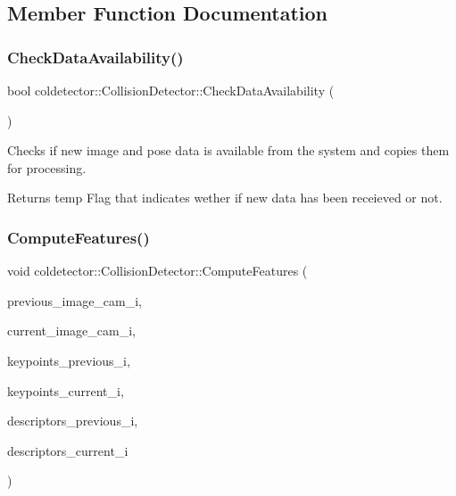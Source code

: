 \subsection{Member Function Documentation}
\mbox{\label{classcoldetector_1_1CollisionDetector_aa4b6c5b052532e545758f84a668b43b2}} 
\subsubsection{\texorpdfstring{Check\+Data\+Availability()}{CheckDataAvailability()}}
{\footnotesize\ttfamily bool coldetector\+::\+Collision\+Detector\+::\+Check\+Data\+Availability (\begin{DoxyParamCaption}{ }\end{DoxyParamCaption})}



Checks if new image and pose data is available from the system and copies them for processing. 

\begin{DoxyReturn}{Returns}
temp Flag that indicates wether if new data has been receieved or not. 
\end{DoxyReturn}
\mbox{\label{classcoldetector_1_1CollisionDetector_af385733b461bda4f537cb97f7616a352}} 
\subsubsection{\texorpdfstring{Compute\+Features()}{ComputeFeatures()}}
{\footnotesize\ttfamily void coldetector\+::\+Collision\+Detector\+::\+Compute\+Features (\begin{DoxyParamCaption}\item[{const cv\+::\+Mat \&}]{previous\+\_\+image\+\_\+cam\+\_\+i,  }\item[{const cv\+::\+Mat \&}]{current\+\_\+image\+\_\+cam\+\_\+i,  }\item[{std\+::vector$<$ cv\+::\+Key\+Point $>$ \&}]{keypoints\+\_\+previous\+\_\+i,  }\item[{std\+::vector$<$ cv\+::\+Key\+Point $>$ \&}]{keypoints\+\_\+current\+\_\+i,  }\item[{cv\+::\+Mat \&}]{descriptors\+\_\+previous\+\_\+i,  }\item[{cv\+::\+Mat \&}]{descriptors\+\_\+current\+\_\+i }\end{DoxyParamCaption})}



